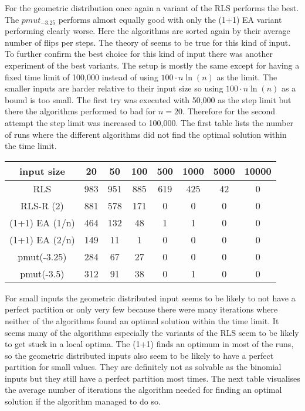For the geometric distribution once again a variant of the RLS performs the best.
The $pmut_{-3.25}$ performs almost equally good with only the (1+1) EA variant performing clearly worse.
Here the algorithms are sorted again by their average number of flips per steps. The theory of seems to be true for this kind of input.\newline
To further confirm the best choice for this kind of input there was another experiment of the best variants.
The setup is mostly the same except for having a fixed time limit of 100,000 instead of using $100 \cdot n\ln(n)$ as the limit.
The smaller inputs are harder relative to their input size so using $100 \cdot n\ln(n)$ as a bound is too small.
The first try was executed with 50,000 as the step limit but there the algorithms performed to bad for $n=20$.
Therefore for the second attempt the step limit was increased to 100,000.
The first table lists the number of runs where the different algorithms did not find the optimal solution within the time limit.

\begin{tabular}{cccccccc}

      input size     & 20  & 50  & 100 & 500 & 1000 & 5000 & 10000 \\\hline
      RLS            & 983 & 951 & 885 & 619 & 425  & 42   & 0     \\
      RLS-R (2)      & 881 & 578 & 171 & 0   & 0    & 0    & 0     \\
      (1+1) EA (1/n) & 464 & 132 & 48  & 1   & 1    & 0    & 0     \\
      (1+1) EA (2/n) & 149 & 11  & 1   & 0   & 0    & 0    & 0     \\
      pmut(-3.25)    & 284 & 67  & 27  & 0   & 0    & 0    & 0     \\
      pmut(-3.5)     & 312 & 91  & 38  & 0   & 1    & 0    & 0     \\
\end{tabular}

For small inputs the geometric distributed input seems to be likely to not have a perfect partition or only very few because there were many iterations where neither of the algorithms found an optimal solution within the time limit.
It seems many of the algorithms especially the variants of the RLS seem to be likely to get stuck in a local optima.
The (1+1) finds an optimum in most of the runs, so the geometric distributed inputs also seem to be likely to have a perfect partition for small values.
They are definitely not as solvable as the binomial inputs but they still have a perfect partition most times.
The next table visualises the average number of iterations the algorithm needed for finding an optimal solution if the algorithm managed to do so.


